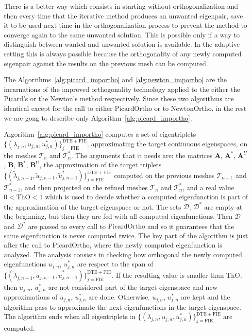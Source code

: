 \documentclass[smallextended]{svjour3}
\newcommand{\cT}{\mathcal{T}}
\begin{document}
There is a better way which consists in starting without 
orthogonalization and then every time that the iterative method produces an unwanted eigenpair, save it to be used next time in the orthogonalization process to prevent the method to converge again to the same unwanted solution. This is possible only if a way to distinguish between wanted and unwanted solution is available. In the adaptive setting this is always possible because  the orthogonality of any newly computed eigenpair against the results on the previous mesh can be computed.

The Algorithms~\ref{alg:picard_importho} and \ref{alg:newton_importho} are the incarnations of the improved orthogonality technology applied to the either the Picard's or the Newton's method respectively. Since these two algorithms are identical except for the call to either $\mathrm{PicardOrtho}$ or to $\mathrm{NewtonOrtho}$, in the rest we are gong to describe only Algorithm~\ref{alg:picard_importho}.

Algorithm~\ref{alg:picard_importho} computes a set of eigentriplets $\{(\lambda_{j,n},u_{j,n},u_{j,n}^*)\}_{j=\mathrm{FIE}}^{\mathrm{DTE}+\mathrm{FIE}}$, approximating the target continuous eigenspaces, on the meshes $\cT_n$ and $\cT_n^*$. The arguments that it needs are: the matrices $\mathbf{A}$, $\mathbf{A}^*$, $\mathbf{A}^U$, $\mathbf{B}$, $\mathbf{B}^*$, $\mathbf{B}^U$, the approximation of the target triplets $\{(\tilde\lambda_{j,n-1},\tilde u_{j,n-1},\tilde u_{j,n-1}^*)\}_{j=\mathrm{FIE}}^{\mathrm{DTE}+\mathrm{FIE}}$ computed on the previous meshes $\cT_{n-1}$ and $\cT_{n-1}^*$, and then projected on the refined meshes $\cT_n$ and $\cT_n^*$, and a real value $0<\mathrm{ThO}<1$ which is used to decide whether a computed eigenfunction is part of the approximation of the target eigenspace or not. The sets $\mathcal{D}$, $\mathcal{D}^*$ are empty at the beginning, but then they are fed with all computed eigenfunctions. Then $\mathcal{D}$ and $\mathcal{D}^*$ are passed to every call to $\mathrm{PicardOrtho}$ and so it guarantees that the same eigenfunction is never computed twice.
The key part of the algorithm is just after the call to $\mathrm{PicardOrtho}$, where the newly computed eigenfunction is analyzed. The analysis consists in checking how orthogonal the newly computed eigenfunctions $u_{j,n}$, $u_{j,n}^*$ are respect to the span of $\{(\tilde\lambda_{j,n-1},\tilde u_{j,n-1},\tilde u_{j,n-1}^*)\}_{j=\mathrm{FIE}}^{\mathrm{DTE}+\mathrm{FIE}}$. If the resulting value is smaller than $\mathrm{ThO}$, then $u_{j,n}$, $u_{j,n}^*$ are not considered part of the target eigenspace and new approximations of  $u_{j,n}$, $u_{j,n}^*$ are done. Otherwise, $u_{j,n}$, $u_{j,n}^*$ are kept and the algorithm pass to approximate the next eigenfunctions in the target eigenspace.
The algorithm ends when all eigentriplets in $\{(\lambda_{j,n},u_{j,n},u_{j,n}^*)\}_{j=\mathrm{FIE}}^{\mathrm{DTE}+\mathrm{FIE}}$ are computed.
\end{document}
